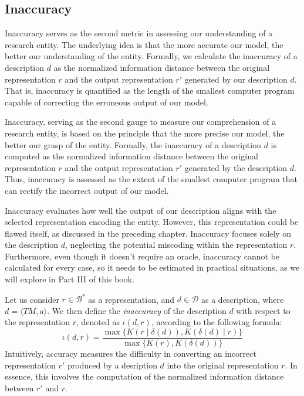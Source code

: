 \subsection{Inaccuracy}

Inaccuracy serves as the second metric in assessing our understanding of a research entity. The underlying idea is that the more accurate our model, the better our understanding of the entity. Formally, we calculate the inaccuracy of a description $d$ as the normalized information distance between the original representation $r$ and the output representation $r'$ generated by our description $d$. That is, inaccuracy is quantified as the length of the smallest computer program capable of correcting the erroneous output of our model.

Inaccuracy, serving as the second gauge to measure our comprehension of a research entity, is based on the principle that the more precise our model, the better our grasp of the entity. Formally, the inaccuracy of a description $d$ is computed as the normalized information distance between the original representation $r$ and the output representation $r'$ generated by the description $d$. Thus, inaccuracy is assessed as the extent of the smallest computer program that can rectify the incorrect output of our model.

Inaccuracy evaluates how well the output of our description aligns with the selected representation encoding the entity. However, this representation could be flawed itself, as discussed in the preceding chapter. Inaccuracy focuses solely on the description $d$, neglecting the potential miscoding within the representation $r$. Furthermore, even though it doesn't require an oracle, inaccuracy cannot be calculated for every case, so it needs to be estimated in practical situations, as we will explore in Part III of this book.

Let us consider $r \in \mathcal{B}^\ast$ as a representation, and $d \in \mathcal{D}$ as a description, where $d = \langle TM, a \rangle$. We then define the \emph{inaccuracy} of the description $d$ with respect to the representation $r$, denoted as $\iota(d, r)$, according to the following formula:
\[
\iota(d, r) = \frac{ \max\{ K \left(r \mid \delta(d) \right), K \left( \delta(d) \mid r \right) \} } { \max\{ K(r), K \left(\delta(d) \right) \} }
\]
Intuitively, accuracy measures the difficulty in converting an incorrect representation $r'$ produced by a desription $d$ into the original representation $r$. In essence, this involves the computation of the normalized information distance between $r'$ and $r$.

